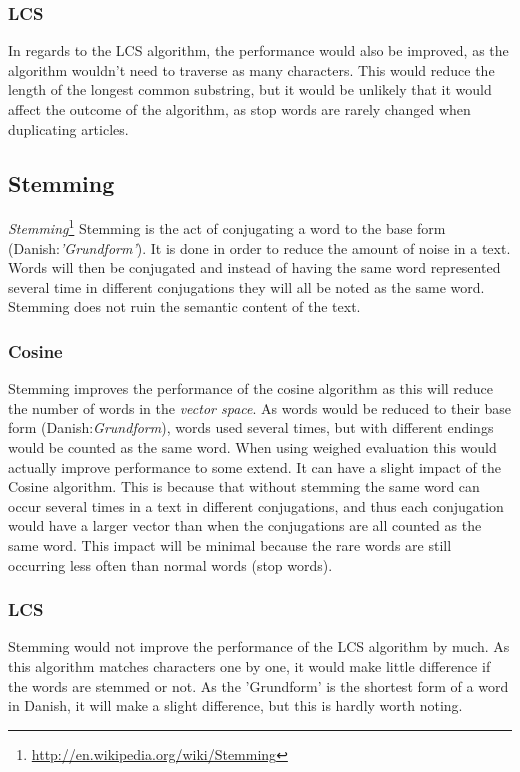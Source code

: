 \subsubsection{LCS}
In regards to the LCS algorithm, the performance would also be improved, as the algorithm wouldn't need to traverse as many characters. This would reduce the length of the longest common substring, but it would be unlikely that it would affect the outcome of the algorithm, as stop words are rarely changed when duplicating articles.

\subsection{Stemming}
\textit{Stemming}\footnote{\url{http://en.wikipedia.org/wiki/Stemming}} Stemming is the act of conjugating a word to the base form (Danish:\textit{'Grundform'}). It is done in order to reduce the amount of noise in a text. Words will then be conjugated and instead of having the same word represented several time in different conjugations they will all be noted as the same word. Stemming does not ruin the semantic content of the text.

\subsubsection{Cosine}
Stemming improves the performance of the cosine algorithm as this will reduce the number of words in the \textit{vector space}. As words would be reduced to their base form (Danish:\textit{Grundform}), words used several times, but with different endings would be counted as the same word. When using weighed evaluation this would actually improve performance to some extend. It can have a slight impact of the Cosine algorithm. This is because that without stemming the same word can occur several times in a text in different conjugations, and thus each conjugation would have a larger vector than when the conjugations are all counted as the same word. This impact will be minimal because the rare words are still occurring less often than normal words (stop words).

\subsubsection{LCS}
Stemming would not improve the performance of the LCS algorithm by much. As this algorithm matches characters one by one, it would make little difference if the words are stemmed or not. As the 'Grundform' is the shortest form of a word in Danish, it will make a slight difference, but this is hardly worth noting.

